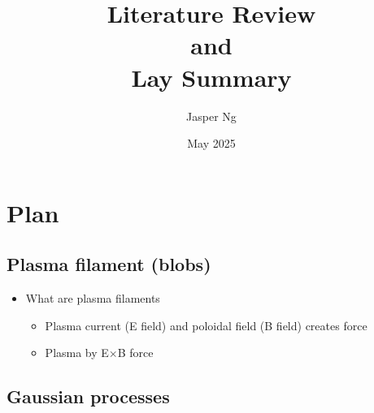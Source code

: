 \documentclass{article}
\title{\textbf{Literature Review \\and \\Lay Summary}}
\author{Jasper Ng}
\date{May 2025}
\begin{document}
\maketitle

\section*{Plan}
\subsection*{Plasma filament (blobs)}
\begin{itemize}
    \item What are plasma filaments \cite{omotani_effects_2015}
    \begin{itemize}
        \item Plasma current (E field) and poloidal field (B field) creates force
        \item Plasma by E$\times$B force
        
    \end{itemize}
\end{itemize}

\subsection*{Gaussian processes}

\nocite{*}
\printbibliography[title={References}]
\end{document}
